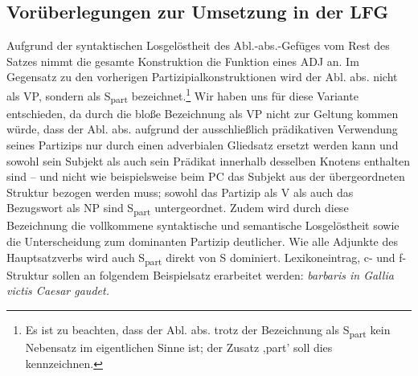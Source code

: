 \documentclass[12pt,a4paper]{article}
\begin{document}
\subsection{Vorüberlegungen zur Umsetzung in der LFG}
Aufgrund der syntaktischen Losgelöstheit des Abl.-abs.-Gefüges vom Rest des Satzes nimmt die gesamte Konstruktion die Funktion eines ADJ an. Im Gegensatz zu den vorherigen Partizipialkonstruktionen wird der Abl. abs. nicht als VP, sondern als S\textsubscript{part} bezeichnet.\footnote{Es ist zu beachten, dass der Abl. abs. trotz der Bezeichnung als S\textsubscript{part} kein Nebensatz im eigentlichen Sinne ist; der Zusatz ,part' soll dies kennzeichnen.}
Wir haben uns für diese Variante entschieden, da durch die bloße Bezeichnung als VP nicht zur Geltung kommen würde, dass der Abl. abs. aufgrund der ausschließlich prädikativen Verwendung seines Partizips nur durch einen adverbialen Gliedsatz ersetzt werden kann und sowohl sein Subjekt als auch sein Prädikat innerhalb desselben Knotens enthalten sind -- und nicht wie beispielsweise beim PC das Subjekt aus der übergeordneten Struktur bezogen werden muss; sowohl das Partizip als V als auch das Bezugswort als NP sind S\textsubscript{part} untergeordnet. Zudem wird durch diese Bezeichnung die vollkommene syntaktische und semantische Losgelöstheit sowie die Unterscheidung zum dominanten Partizip deutlicher. Wie alle Adjunkte des Hauptsatzverbs wird auch S\textsubscript{part} direkt von S dominiert.
Lexikoneintrag, c- und f-Struktur sollen an folgendem Beispielsatz erarbeitet werden:  \textit{barbaris in Gallia victis Caesar gaudet.}
\newline
\newline
\end{document}
